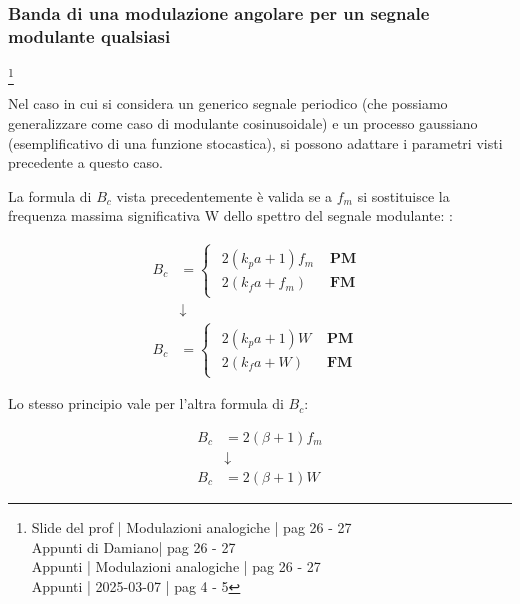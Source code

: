 \newpage

\subsubsection{Banda di una modulazione angolare per un segnale modulante qualsiasi}
\footnote{Slide del prof | Modulazioni analogiche | pag 26 - 27\\  
Appunti di Damiano| pag 26 - 27\\
Appunti | Modulazioni analogiche | pag 26 - 27\\
Appunti | 2025-03-07 | pag 4 - 5
}

Nel caso in cui si considera un generico segnale periodico (che possiamo generalizzare come caso di modulante cosinusoidale) 
e un processo gaussiano (esemplificativo di una funzione stocastica), si possono adattare i parametri visti precedente a questo caso. \newline 

La formula di $B_c$ vista precedentemente è valida se a $f_m$ si sostituisce la frequenza massima significativa W dello spettro del segnale modulante:
: 

{
    \Large 
    \begin{equation}
        \begin{split}
        B_c
        &= 
        \begin{cases}
            \begin{array}{ll}
            2 (k_p a + 1) f_m & \textbf{ PM} 
            \\
            2 (k_f a + f_m) & \textbf{ FM}
            \end{array} 
        \end{cases}
        \\
        &\downarrow
        \\
        B_c
        &= 
        \begin{cases}
            \begin{array}{ll}
            2 (k_p a + 1) W & \textbf{ PM} 
            \\
            2 (k_f a + W) & \textbf{ FM}
            \end{array} 
        \end{cases} 
        \end{split}
    \end{equation}
}


Lo stesso principio vale per l'altra formula di $B_c$: 

{
    \Large 
    \begin{equation}
        \begin{split}
            B_c &= 2 (\beta + 1) f_m 
        \\
        &\downarrow
        \\
        B_c &= 2 (\beta + 1) W
        \end{split}
    \end{equation}
}

